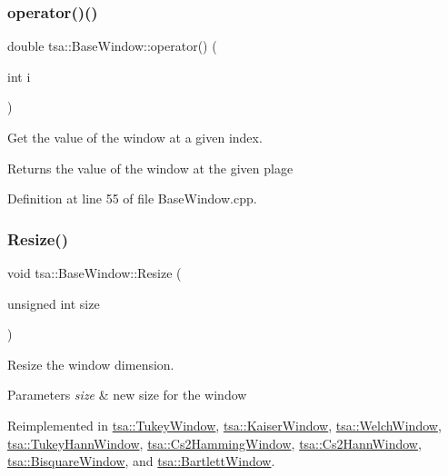\subsubsection{\texorpdfstring{operator()()}{operator()()}\hspace{0.1cm}{\footnotesize\ttfamily [3/3]}}
{\footnotesize\ttfamily double tsa\+::\+Base\+Window\+::operator() (\begin{DoxyParamCaption}\item[{int}]{i }\end{DoxyParamCaption})}

Get the value of the window at a given index.

\begin{DoxyReturn}{Returns}
the value of the window at the given plage 
\end{DoxyReturn}


Definition at line 55 of file Base\+Window.\+cpp.

\mbox{\label{classtsa_1_1_base_window_a8a2a3425f2915762d50fa57dd0e04f22}} 
\subsubsection{\texorpdfstring{Resize()}{Resize()}}
{\footnotesize\ttfamily void tsa\+::\+Base\+Window\+::\+Resize (\begin{DoxyParamCaption}\item[{unsigned int}]{size }\end{DoxyParamCaption})\hspace{0.3cm}{\ttfamily [virtual]}}

Resize the window dimension.


\begin{DoxyParams}{Parameters}
{\em size} & new size for the window \\
\hline
\end{DoxyParams}


Reimplemented in \hyperlink{classtsa_1_1_tukey_window_acfb62239e47e5faa44210407c7c7f42f}{tsa\+::\+Tukey\+Window}, \hyperlink{classtsa_1_1_kaiser_window_ae573c5ab979c3292d10feddc5180b6b4}{tsa\+::\+Kaiser\+Window}, \hyperlink{classtsa_1_1_welch_window_a5ad861714524733e648660d817e219d6}{tsa\+::\+Welch\+Window}, \hyperlink{classtsa_1_1_tukey_hann_window_a253c1786cef6ec7b5e7ef700f4238496}{tsa\+::\+Tukey\+Hann\+Window}, \hyperlink{classtsa_1_1_cs2_hamming_window_aa455906419c91055a59da8381c3a7588}{tsa\+::\+Cs2\+Hamming\+Window}, \hyperlink{classtsa_1_1_cs2_hann_window_a540187b8c32000d00d3023e8f8418264}{tsa\+::\+Cs2\+Hann\+Window}, \hyperlink{classtsa_1_1_bisquare_window_a0970518373e007e0fdd95701ff744c6f}{tsa\+::\+Bisquare\+Window}, and \hyperlink{classtsa_1_1_bartlett_window_af63f6fdd7e2a10d77db1c7363e9963f5}{tsa\+::\+Bartlett\+Window}.



